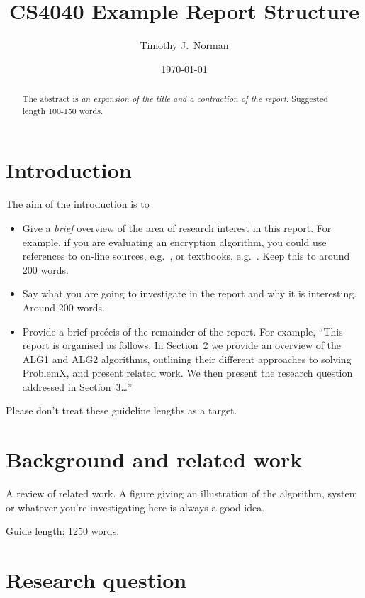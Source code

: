 \documentclass{csfourzero}
\title{CS4040 Example Report Structure}
\author{Timothy J.\ Norman}
\date{\today}
\begin{document}
\maketitle

\begin{abstract}
The abstract is \emph{an expansion of the title and a contraction of
  the report}. Suggested length 100-150 words.
\end{abstract}                                                                                                          
\section{Introduction}
\label{sec:intro}

The aim of the introduction is to
\begin{itemize}
\item Give a \emph{brief} overview of the area of research interest in
  this report. For example, if you are evaluating an encryption
  algorithm, you could use references to on-line sources,
  e.g.\ \cite{cryptowiki}, or textbooks,
  e.g.\ \cite{Stallings2010}. Keep this to around 200 words.
\item Say what you are going to investigate in the report and why it
  is interesting. Around 200 words.
\item Provide a brief pre\'{e}cis of the remainder of the report. For
  example, ``This report is organised as follows. In
  Section~\ref{sec:lit} we provide an overview of the ALG1 and ALG2
  algorithms, outlining their different approaches to solving
  ProblemX, and present related work. We then present the research
  question addressed in Section~\ref{sec:rq}\ldots''
\end{itemize}

Please don't treat these guideline lengths as a target.

\section{Background and related work}
\label{sec:lit}

A review of related work. A figure giving an illustration of the
algorithm, system or whatever you're investigating here is always a
good idea.

Guide length: 1250 words.

\section{Research question}
\label{sec:rq}
\end{document}
